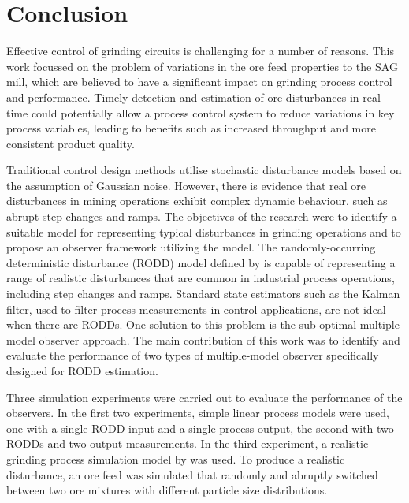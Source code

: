 \chapter*{Conclusion}           %
\label{chap-conclusion}         %

Effective control of grinding circuits is challenging for a number of reasons. This work focussed on the problem of variations in the ore feed properties to the \gls{SAG} mill, which are believed to have a significant impact on grinding process control and performance. Timely detection and estimation of ore disturbances in real time could potentially allow a process control system to reduce variations in key process variables, leading to benefits such as increased throughput and more consistent product quality.

Traditional control design methods utilise stochastic disturbance models based on the assumption of Gaussian noise. However, there is evidence that real ore disturbances in mining operations exhibit complex dynamic behaviour, such as abrupt step changes and ramps. The objectives of the research were to identify a suitable model for representing typical disturbances in grinding operations and to propose an observer framework utilizing the model. The randomly-occurring deterministic disturbance (\gls{RODD}) model defined by \cite{macgregor_duality_1984} is capable of representing a range of realistic disturbances that are common in industrial process operations, including step changes and ramps. Standard state estimators such as the Kalman filter, used to filter process measurements in control applications, are not ideal when there are \gls{RODD}s. One solution to this problem is the sub-optimal multiple-model observer approach. The main contribution of this work was to identify and evaluate the performance of two types of multiple-model observer specifically designed for \gls{RODD} estimation.

Three simulation experiments were carried out to evaluate the performance of the observers. In the first two experiments, simple linear process models were used, one with a single \gls{RODD} input and a single process output, the second with two \gls{RODD}s and two output measurements. In the third experiment, a realistic grinding process simulation model by \cite{perez_garcia_dynamic_2020} was used. To produce a realistic disturbance, an ore feed was simulated that randomly and abruptly switched between two ore mixtures with different particle size distributions.

